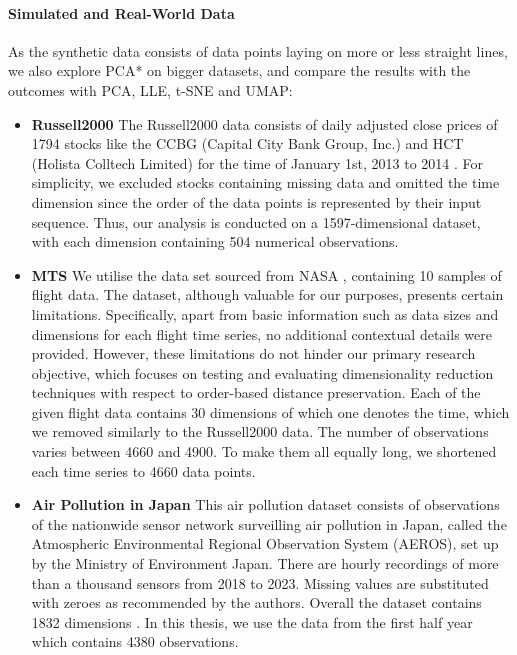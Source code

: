 \documentclass[pdftex,12pt,a4paper]{report}
\begin{document}
\paragraph{Simulated and Real-World Data} \label{real-world-data}
As the synthetic data consists of data points laying on more or less straight lines, we also explore PCA* on bigger datasets, and compare the results with the outcomes with PCA, LLE, t-SNE and UMAP:
\begin{itemize}
    \item \textbf{Russell2000} The Russell2000 data consists of daily adjusted close prices of 1794 stocks like the CCBG (Capital City Bank Group, Inc.) and HCT (Holista Colltech Limited) for the time of January 1st, 2013 to 2014 \cite{russell2000}.
    For simplicity, we excluded stocks containing missing data and omitted the time dimension since the order of the data points is represented by their input sequence.
    Thus, our analysis is conducted on a 1597-dimensional dataset, with each dimension containing 504 numerical observations.
    \item \textbf{MTS} We utilise the data set sourced from NASA \cite{mts-flights}, containing 10 samples of flight data.
    The dataset, although valuable for our purposes, presents certain limitations.
    Specifically, apart from basic information such as data sizes and dimensions for each flight time series, no additional contextual details were provided.
    However, these limitations do not hinder our primary research objective, which focuses on testing and evaluating dimensionality reduction techniques with respect to order-based distance preservation.
    Each of the given flight data contains 30 dimensions of which one denotes the time, which we removed similarly to the Russell2000 data.
    The number of observations varies between 4660 and 4900.
    To make them all equally long, we shortened each time series to 4660 data points.
    \item \textbf{Air Pollution in Japan} This air pollution dataset consists of observations of the nationwide sensor network surveilling air pollution in Japan, called the Atmospheric Environmental Regional Observation System (AEROS), set up by the Ministry of Environment Japan.
    There are hourly recordings of more than a thousand sensors from 2018 to 2023.
    Missing values are substituted with zeroes as recommended by the authors.
    Overall the dataset contains 1832 dimensions \cite{air_pollution}.
    In this thesis, we use the data from the first half year which contains 4380 observations.
\end{itemize}
\end{document}
